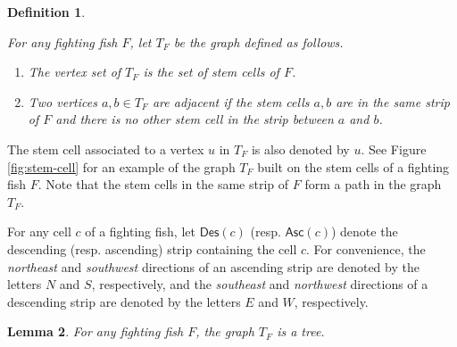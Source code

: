 \documentclass[a4paper,11pt,reqno]{amsart}
\newtheorem{lem}{Lemma}[section]
\newtheorem{defi}[lem]{Definition}
\theoremstyle{definition}
\numberwithin{equation}{section}
\newcommand{\Des}{{\textsf{Des}}}
\newcommand{\Asc}{{\textsf{Asc}}}
\begin{document}
\begin{defi} \label{def:graph T_F} {\rm
For any fighting fish $F$, let $T_F$ be the graph defined as follows. 
\begin{enumerate}
\item The vertex set of $T_F$ is the set of stem cells of $F$.
\item Two vertices $a,b\in T_F$ are adjacent if the stem cells $a,b$ are in the same strip of $F$ and there is no other stem cell in the strip between $a$ and $b$.
\end{enumerate}
}
\end{defi}

The stem cell associated to a vertex $u$ in $T_F$ is also denoted by $u$. See Figure \ref{fig:stem-cell} for an example of the graph $T_F$ built on the stem cells of a fighting fish $F$. Note that the stem cells in the same strip of $F$ form a path in the graph $T_F$. 


For any cell $c$ of a fighting fish, let $\Des(c)$ (resp. $\Asc(c)$) denote the descending (resp. ascending) strip containing the cell $c$. For convenience, the \emph{northeast} and \emph{southwest} directions of an ascending strip are denoted by the letters $N$ and $S$, respectively, and the \emph{southeast} and \emph{northwest} directions of a descending strip are denoted by the letters $E$ and $W$, respectively. 


\begin{lem} \label{lem:TF-is-tree} For any fighting fish $F$, the graph $T_F$ is a tree.
\end{lem}
\end{document}

